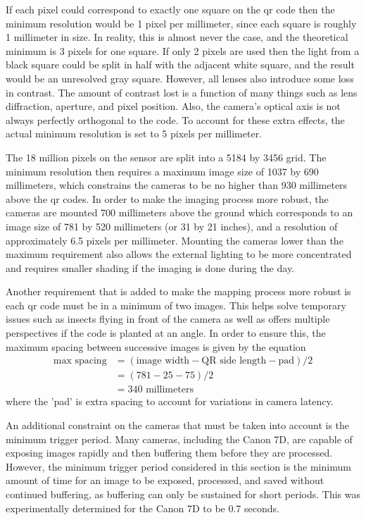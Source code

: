 If each pixel could correspond to exactly one square on the \ac{qr} code then the minimum resolution would be 1 pixel per millimeter, since each square is roughly 1 millimeter in size.  In reality, this is almost never the case, and the theoretical minimum is 3 pixels for one square.  If only 2 pixels are used then the light from a black square could be split in half with the adjacent white square, and the result would be an unresolved gray square.  However, all lenses also introduce some loss in contrast.  The amount of contrast lost is a function of many things such as lens diffraction, aperture, and pixel position.  Also, the camera's optical axis is not always perfectly orthogonal to the code.  To account for these extra effects, the actual minimum resolution is set to 5 pixels per millimeter.  

The 18 million pixels on the sensor are split into a 5184 by 3456 grid.  The minimum resolution then requires a maximum image size of 1037 by 690 millimeters, which constrains the cameras to be no higher than 930 millimeters above the \ac{qr} codes.  In order to make the imaging process more robust, the cameras are mounted 700 millimeters above the ground which corresponds to an image size of 781 by 520 millimeters (or 31 by 21 inches), and a resolution of approximately 6.5 pixels per millimeter.  Mounting the cameras lower than the maximum requirement also allows the external lighting to be more concentrated and requires smaller shading if the imaging is done during the day.  

Another requirement that is added to make the mapping process more robust is each \ac{qr} code must be in a minimum of two images.  This helps solve temporary issues such as insects flying in front of the camera as well as offers multiple perspectives if the code is planted at an angle.  In order to ensure this, the maximum spacing between successive images is given by the equation
\begin{align*}
 \text{max spacing} &= (\text{image width} - \text{QR side length} - \text{pad}) / 2 \\
             &= (781 - 25 - 75) / 2 \\ 
             &= 340 \text{ millimeters}
\end{align*}
where the 'pad' is extra spacing to account for variations in camera latency.
  
An additional constraint on the cameras that must be taken into account is the minimum trigger period.  Many cameras, including the Canon 7D, are capable of exposing images rapidly and then buffering them before they are processed.  However, the minimum trigger period considered in this section is the minimum amount of time for an image to be exposed, processed, and saved without continued buffering, as buffering can only be sustained for short periods.  This was experimentally determined for the Canon 7D to be 0.7 seconds.  

